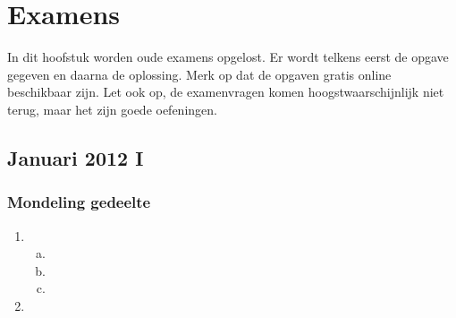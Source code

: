 \documentclass[main.tex]{subfiles}
\begin{document}
\chapter{Examens}
\label{cha:examens}
In dit hoofstuk worden oude examens opgelost.
Er wordt telkens eerst de opgave gegeven en daarna de oplossing.
Merk op dat de opgaven gratis online beschikbaar zijn.
Let ook op, de examenvragen komen hoogstwaarschijnlijk niet terug, maar het zijn goede oefeningen.




\section{Januari 2012 I}

\subsection{Mondeling gedeelte}
\begin{enumerate}
\item
  \begin{enumerate}[(a)]
  \item \TODO{}
  \item \TODO{}
  \item \TODO{}
  \end{enumerate}
\item \TODO{}
\end{enumerate}
\end{document}
